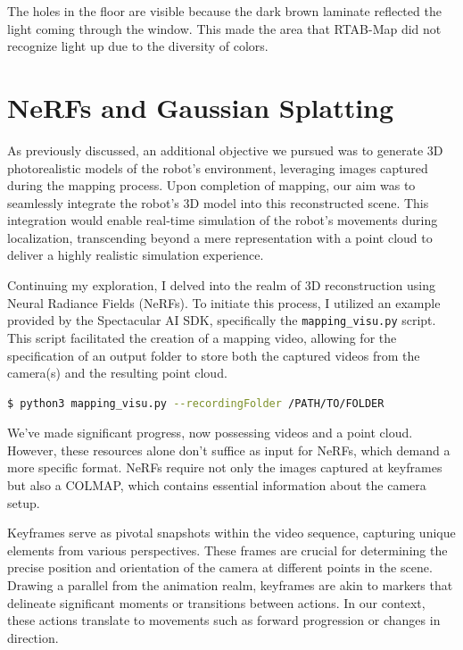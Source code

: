 The holes in the floor are visible because the dark brown laminate reflected the light coming through the window. This made the area that RTAB-Map did not recognize light up due to the diversity of colors.

\section{NeRFs and Gaussian Splatting} \label{nerf_gsplat}

As previously discussed, an additional objective we pursued was to generate 3D photorealistic models of the robot's environment, leveraging images captured during the mapping process. Upon completion of mapping, our aim was to seamlessly integrate the robot's 3D model into this reconstructed scene. This integration would enable real-time simulation of the robot's movements during localization, transcending beyond a mere representation with a point cloud to deliver a highly realistic simulation experience.

Continuing my exploration, I delved into the realm of 3D reconstruction using Neural Radiance Fields (NeRFs)\cite{nerf}. To initiate this process, I utilized an example provided by the Spectacular AI SDK, specifically the \verb|mapping_visu.py| script. This script facilitated the creation of a mapping video, allowing for the specification of an output folder to store both the captured videos from the camera(s) and the resulting point cloud.

\begin{lstlisting}[language=bash,frame=single,float=!ht]
$ python3 mapping_visu.py --recordingFolder /PATH/TO/FOLDER
\end{lstlisting}

We've made significant progress, now possessing videos and a point cloud. However, these resources alone don't suffice as input for NeRFs, which demand a more specific format. NeRFs require not only the images captured at keyframes but also a COLMAP, which contains essential information about the camera setup.

Keyframes serve as pivotal snapshots within the video sequence, capturing unique elements from various perspectives. These frames are crucial for determining the precise position and orientation of the camera at different points in the scene. Drawing a parallel from the animation realm\cite{keyframes_in_animation}, keyframes are akin to markers that delineate significant moments or transitions between actions. In our context, these actions translate to movements such as forward progression or changes in direction.

